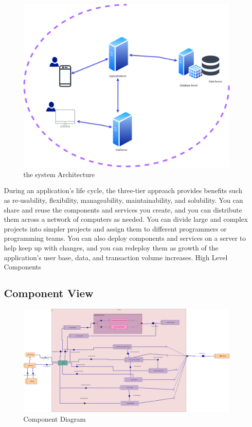 \begin{figure}[H]
\includegraphics[width=1\textwidth]{figures/systemArchitecture.png}
\caption{\label{fig:student } the system Architecture }
\end{figure}

During an application's life cycle, the three-tier approach provides benefits such as re-usability, flexibility, manageability, maintainability, and solubility. You can share and reuse the components and services you create, and you can distribute them across a network of computers as needed. You can divide large and complex projects into simpler projects and assign them to different programmers or programming teams. You can also deploy components and services on a server to help keep up with changes, and you can redeploy them as growth of the application's user base, data, and transaction volume increases.
High Level Components
\clearpage

\subsection{Component View}

\begin{figure}[H]

\includegraphics[angle=90,width=.6\textwidth]{figures/componenDiagramnew.png}
\caption{\label{fig:student } Component Diagram }
\end{figure}

